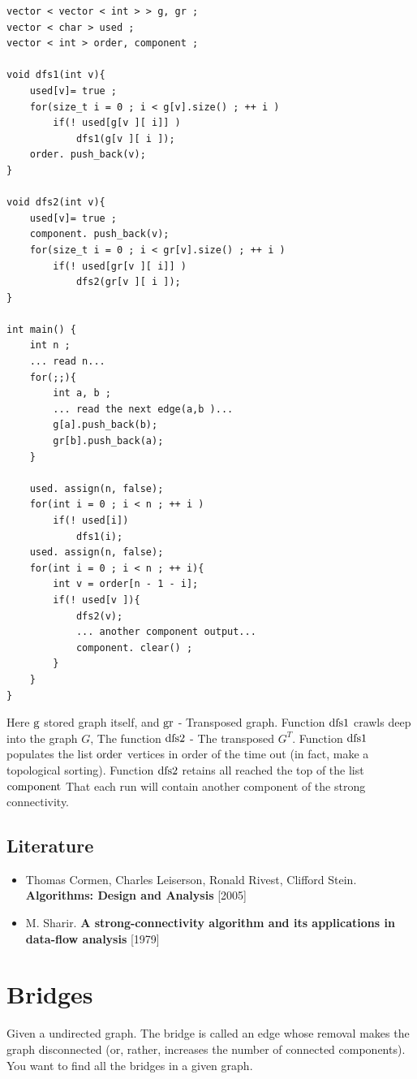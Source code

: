\begin{verbatim}
vector < vector < int > > g, gr ;
vector < char > used ;
vector < int > order, component ;
 
void dfs1(int v){
    used[v]= true ;
    for(size_t i = 0 ; i < g[v].size() ; ++ i )
        if(! used[g[v ][ i]] )
            dfs1(g[v ][ i ]);
    order. push_back(v);
}
 
void dfs2(int v){
    used[v]= true ;
    component. push_back(v);
    for(size_t i = 0 ; i < gr[v].size() ; ++ i )
        if(! used[gr[v ][ i]] )
            dfs2(gr[v ][ i ]);
}
 
int main() {
    int n ;
    ... read n...
    for(;;){
        int a, b ;
        ... read the next edge(a,b )...
        g[a].push_back(b);
        gr[b].push_back(a);
    }
 
    used. assign(n, false);
    for(int i = 0 ; i < n ; ++ i )
        if(! used[i])
            dfs1(i);
    used. assign(n, false);
    for(int i = 0 ; i < n ; ++ i){
        int v = order[n - 1 - i];
        if(! used[v ]){
            dfs2(v);
            ... another component output...
            component. clear() ;
        }
    }
} 
\end{verbatim}
Here $\rm g$ stored graph itself, and $\rm gr$ - Transposed graph. Function $\rm dfs1$ crawls deep into the graph $G$, The function $\rm dfs2$ - The transposed $G ^ T$. Function $\rm dfs1$ populates the list $\rm order$ vertices in order of the time out (in fact, make a topological sorting). Function $\rm dfs2$ retains all reached the top of the list $\rm component$ That each run will contain another component of the strong connectivity.

\subsection{ Literature }

\begin{itemize} \item Thomas Cormen, Charles Leiserson, Ronald Rivest, Clifford Stein. \textbf{Algorithms: Design and Analysis} [2005] \item M. Sharir. \textbf{A strong-connectivity algorithm and its applications in data-flow analysis} [1979] \end{itemize}

\section{ Bridges }
Given a undirected graph. The bridge is called an edge whose removal makes the graph disconnected (or, rather, increases the number of connected components). You want to find all the bridges in a given graph.

